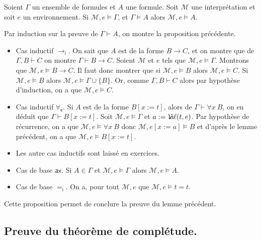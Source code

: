 \documentclass[./main]{subfiles}
\begin{document}
  \begin{prop}
    Soient $\Gamma$ un ensemble de formules et $A$ une formule.
    Soit $\mathcal{M}$ une interprétation et soit $e$ un environnement.
    Si $\mathcal{M}, e \models \Gamma$, et $\Gamma \models A$ alors  $\mathcal{M}, e \models A$.
  \end{prop}
  \begin{prv}
    Par induction sur la preuve de $\Gamma \vdash A$, on montre la proposition précédente.

    \begin{itemize}
      \item Cas inductif $\to_\mathsf{i}$.
        On sait que $A$ est de la forme $B \to C$, et on montre que de $\Gamma, B \vdash C$ on montre $\Gamma \vdash B \to C$.
        Soient $\mathcal{M}$ et $e$ tels que $\mathcal{M}, e \models \Gamma$.
        Montrons que $\mathcal{M}, e \models B \to C$.
        Il faut donc montrer que si $\mathcal{M}, e \models B$ alors $\mathcal{M}, e \models C$.
        Si $\mathcal{M}, e \models B$ alors $\mathcal{M}, e \models \Gamma \cup \{B\}$.
        Or, comme $\Gamma, B \vdash C$ alors par hypothèse d'induction, on a que $\mathcal{M}, e \models C$.
      \item Cas inductif $\forall_\mathsf{e}$.
        Si $A$ est de la forme $B[x := t]$, alors de $\Gamma \vdash \forall x \: B$, on en déduit que $\Gamma \vdash B[x := t]$.
        Soit $\mathcal{M}, e \models \Gamma$ et $a := \mathcal{V}\hspace{-3.5pt}a\hspace{-0.5pt}\ell(t, e)$. Par hypothèse de récurrence, on a que  $\mathcal{M}, e \models \forall x \: B$ donc $\mathcal{M}, e[x := a] \models B$ et d'après le lemme précédent, on a que $\mathcal{M}, e \models B[x := t]$.
      \item Les autre cas inductifs sont laissé en exercices.
      \item Cas de base $\mathsf{ax}$.
        Si $A \in \Gamma$ et $\mathcal{M}, e \models \Gamma$ alors $\mathcal{M}, e \models A$.
      \item Cas de base $=_\mathsf{i}$.
        On a, pour tout $\mathcal{M}, e$ que $\mathcal{M}, e \models t = t$.
    \end{itemize}
    \vspace{-\baselineskip}
  \end{prv}
  Cette proposition permet de conclure la preuve du lemme précédent.

  \subsection{Preuve du théorème de complétude.}
\end{document}
